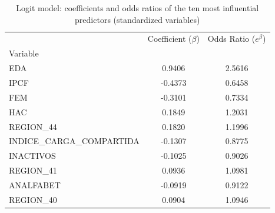 \begin{table}
\caption{Logit model: coefficients and odds ratios of the ten most influential predictors (standardized variables)}
\label{tab:logit_odds}
\begin{tabular}{lcc}
\toprule
 & Coefficient ($\beta$) & Odds Ratio ($e^{\beta}$) \\
Variable &  &  \\
\midrule
EDA & 0.9406 & 2.5616 \\
IPCF & -0.4373 & 0.6458 \\
FEM & -0.3101 & 0.7334 \\
HAC & 0.1849 & 1.2031 \\
REGION\_44 & 0.1820 & 1.1996 \\
INDICE\_CARGA\_COMPARTIDA & -0.1307 & 0.8775 \\
INACTIVOS & -0.1025 & 0.9026 \\
REGION\_41 & 0.0936 & 1.0981 \\
ANALFABET & -0.0919 & 0.9122 \\
REGION\_40 & 0.0904 & 1.0946 \\
\bottomrule
\end{tabular}
\end{table}
